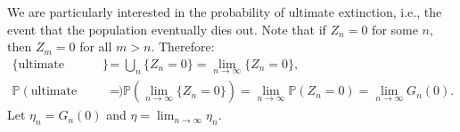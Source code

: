\documentclass{huhtakm-template-book-v2}
\newcommand{\prob}{\mathbb{P}}
\begin{document}
    \begin{eg}
        We are particularly interested in the probability of ultimate extinction, i.e., the event that the population eventually dies out. Note that if $Z_{n} = 0$ for some $n$, then $Z_{m} = 0$ for all $m > n$. Therefore:
        \begin{align*}
            \{\text{ultimate extinction}\} &= \bigcup_{n}\{Z_{n} = 0\} = \lim_{n \to \infty}\{Z_{n} = 0\},\\
            \prob(\text{ultimate extinction}) &= \prob\left(\lim_{n \to \infty}\{Z_{n} = 0\}\right) = \lim_{n \to \infty}\prob(Z_{n} = 0) = \lim_{n \to \infty}G_{n}(0).
        \end{align*}
        Let $\eta_{n} = G_{n}(0)$ and $\eta = \lim_{n \to \infty}\eta_{n}$.
    \end{eg}
    \newpage
\end{document}
